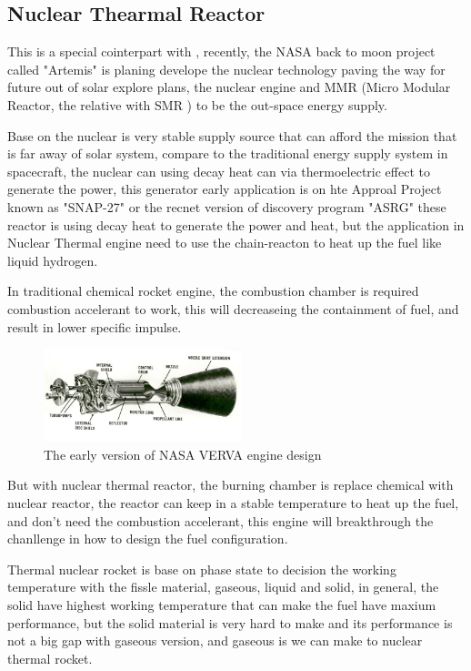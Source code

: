 \documentclass[final,10pt,times,twocolumn]{elsarticle}
\begin{document}
\subsection{Nuclear Thearmal Reactor}
This is a special cointerpart with , recently, the NASA back to moon project called "Artemis" is planing develope the nuclear technology paving the way for future out of solar explore plans, the nuclear engine and MMR (Micro Modular Reactor, the relative with SMR ) to be the out-space energy supply.

Base on the nuclear is very stable supply source that can afford the mission that is far away of solar system, compare to the traditional energy supply system in spacecraft, the nuclear can using decay heat can via thermoelectric effect to generate the power, this generator early application is on hte Approal Project known as "SNAP-27" or the recnet version of discovery program "ASRG" these reactor is using decay heat to generate the power and heat, but the application in Nuclear Thermal engine need to use the chain-reacton to heat up the fuel like liquid hydrogen.

In traditional chemical rocket engine, the combustion chamber is required combustion accelerant to work, this will decreaseing the containment of fuel, and result in lower specific impulse.

\begin{figure}[h]
    \centering
    \includegraphics[width = 5.75cm]{NASA-NERVA-diagram.jpg}
    \caption{The early version of NASA VERVA engine design\cite{wiki:Nuclear_thermal_rocket}}
\end{figure}

But with nuclear thermal reactor, the burning chamber is replace chemical with nuclear reactor, the reactor can keep in a stable temperature to heat up the fuel, and don't need the combustion accelerant, this engine will breakthrough the chanllenge in how to design the fuel configuration.

Thermal nuclear rocket is base on phase state to decision the working temperature with the fissle material, gaseous, liquid and solid, in general, the solid have highest working temperature that can make the fuel have maxium performance, but the solid material is very hard to make and its performance is not a big gap with gaseous version, and gaseous is we can make to nuclear thermal rocket.
\end{document}
